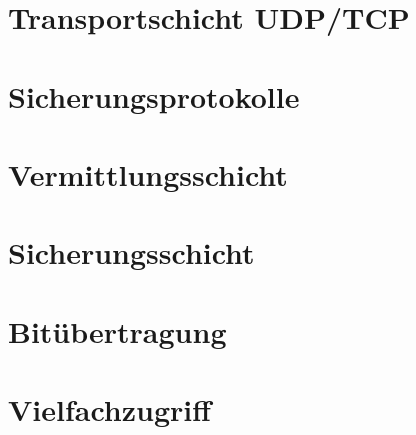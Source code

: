 \chapter{Transportschicht UDP/TCP}
%

\chapter{Sicherungsprotokolle}
%

\chapter{Vermittlungsschicht}
%

\chapter{Sicherungsschicht}
%

\chapter{Bitübertragung}
%

\chapter{Vielfachzugriff}



